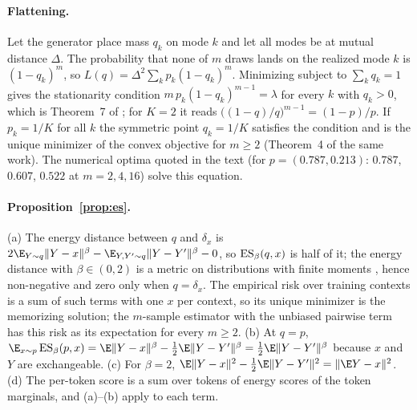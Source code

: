 \paragraph{Flattening.}
Let the generator place mass $q_k$ on mode $k$ and let all modes be at mutual distance $\Delta$. The probability that none of $m$ draws lands on the realized mode $k$ is $(1 - q_k)^m$, so $L(q) = \Delta^2 \sum_k p_k (1 - q_k)^m$. Minimizing subject to $\sum_k q_k = 1$ gives the stationarity condition $m\, p_k (1 - q_k)^{m-1} = \lambda$ for every $k$ with $q_k > 0$, which is Theorem~7 of \citet{bennett2026freedom}; for $K = 2$ it reads $\big((1-q)/q\big)^{m-1} = (1-p)/p$. If $p_k = 1/K$ for all $k$ the symmetric point $q_k = 1/K$ satisfies the condition and is the unique minimizer of the convex objective for $m \ge 2$ (Theorem~4 of the same work). The numerical optima quoted in the text (for $p = (0.787, 0.213)$: $0.787$, $0.607$, $0.522$ at $m = 2, 4, 16$) solve this equation.

\paragraph{Proposition~\ref{prop:es}.}
(a) The energy distance between $q$ and $\delta_x$ is $2\E_{Y \sim q}\|Y - x\|^\beta - \E_{Y, Y' \sim q}\|Y - Y'\|^\beta - 0$, so $\mathrm{ES}_\beta(q, x)$ is half of it; the energy distance with $\beta \in (0, 2)$ is a metric on distributions with finite moments \citep{gneiting2007strictly,dawid2007geometry}, hence non-negative and zero only when $q = \delta_x$. The empirical risk over training contexts is a sum of such terms with one $x$ per context, so its unique minimizer is the memorizing solution; the $m$-sample estimator with the unbiased pairwise term has this risk as its expectation for every $m \ge 2$. (b) At $q = p$, $\E_{x \sim p}\,\IS_\beta(p, x) = \E\|Y - x\|^\beta - \frac{1}{2}\E\|Y - Y'\|^\beta = \frac{1}{2}\E\|Y - Y'\|^\beta$ because $x$ and $Y$ are exchangeable. (c) For $\beta = 2$, $\E\|Y - x\|^2 - \frac{1}{2}\E\|Y - Y'\|^2 = \|\E Y - x\|^2$. (d) The per-token score is a sum over tokens of energy scores of the token marginals, and (a)--(b) apply to each term.

